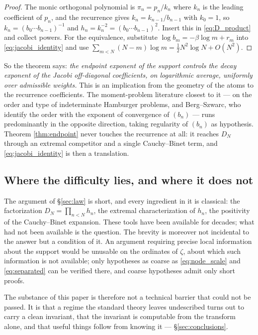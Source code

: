 \documentclass[11pt]{amsart}
\numberwithin{equation}{section}
\theoremstyle{plain}
\theoremstyle{definition}
\theoremstyle{remark}
\begin{document}
\begin{proof}
The monic orthogonal polynomial is $\pi_{n}=p_{n}/k_{n}$ where $k_{n}$ is the leading coefficient of
$p_{n}$, and the recurrence gives $k_{n}=k_{n-1}/b_{n-1}$ with $k_{0}=1$, so
$k_{n}=(b_{0}\cdots b_{n-1})^{-1}$ and $h_{n}=k_{n}^{-2}=(b_{0}\cdots b_{n-1})^{2}$. Insert this in
\eqref{eq:D_product} and collect powers. For the equivalence, substitute
$\log b_{m}=-\beta\log m+r_{m}$ into \eqref{eq:jacobi_identity} and use
$\sum_{m<N}(N-m)\log m=\tfrac12N^{2}\log N+O(N^{2})$.
\end{proof}

So the theorem says: \emph{the endpoint exponent of the support controls the decay exponent of the
Jacobi off-diagonal coefficients, on logarithmic average, uniformly over admissible weights.} This
is an implication from the geometry of the atoms to the recurrence coefficients. The moment-problem
literature closest to it --- \cite{BergPedersen1994} on the order and type of indeterminate Hamburger
problems, and Berg--Szwarc, who identify the order with the exponent of convergence of $(b_{n})$
\cite{BergSzwarc2014} --- runs predominantly in the opposite direction, taking regularity of
$(b_{n})$ as hypothesis. Theorem \ref{thm:endpoint} never touches the recurrence at all: it reaches
$D_{N}$ through an extremal competitor and a single Cauchy--Binet term, and \eqref{eq:jacobi_identity}
is then a translation.

\subsection{Where the difficulty lies, and where it does not}
\label{ss:trivial}

The argument of \S\ref{sec:law} is short, and every ingredient in it is classical: the factorization
$D_{N}=\prod_{n<N}h_{n}$, the extremal characterization of $h_{n}$, the positivity of the
Cauchy--Binet expansion. These tools have been available for decades; what had not been available
is the question. The brevity is moreover not incidental to the answer but a condition of it. An
argument requiring precise local information about the support would be unusable on the ordinates of
$\zeta$, about which such information is not available; only hypotheses as coarse as
\eqref{eq:node_scale} and \eqref{eq:separated} can be verified there, and coarse hypotheses admit
only short proofs.

The substance of this paper is therefore not a technical barrier that could not be passed. It is
that a regime the standard theory leaves undescribed turns out to carry a clean invariant, that the
invariant is computable from the transform alone, and that useful things follow from knowing it
--- \S\ref{sec:conclusions}.
\end{document}
